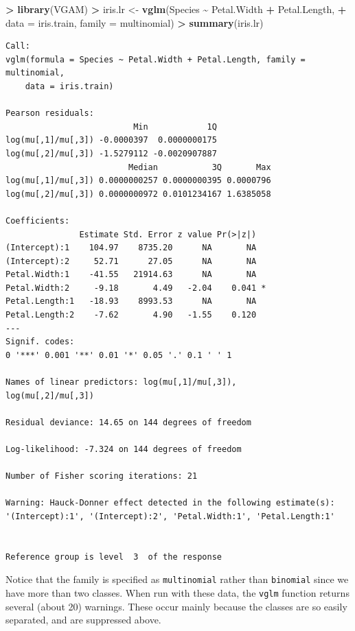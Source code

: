\documentclass[
]{krantz}
\makeatletter
\newenvironment{Shaded}{\begin{snugshade}}{\end{snugshade}}
\newcommand{\DataTypeTok}[1]{\textcolor[rgb]{0.27,0.27,0.27}{#1}}
\newcommand{\KeywordTok}[1]{\textcolor[rgb]{0.27,0.27,0.27}{\textbf{#1}}}
\newcommand{\NormalTok}[1]{#1}
\newcommand{\OperatorTok}[1]{\textcolor[rgb]{0.43,0.43,0.43}{\textbf{#1}}}
\newcommand{\StringTok}[1]{\textcolor[rgb]{0.5,0.5,0.5}{#1}}
\newenvironment{kframe}{%
\medskip{}
\setlength{\fboxsep}{.8em}
 \def\at@end@of@kframe{}%
 \ifinner\ifhmode%
  \def\at@end@of@kframe{\end{minipage}}%
  \begin{minipage}{\columnwidth}%
 \fi\fi%
 \def\FrameCommand##1{\hskip\@totalleftmargin \hskip-\fboxsep
 \colorbox{shadecolor}{##1}\hskip-\fboxsep
     \hskip-\linewidth \hskip-\@totalleftmargin \hskip\columnwidth}%
 \MakeFramed {\advance\hsize-\width
   \@totalleftmargin\z@ \linewidth\hsize
   \@setminipage}}%
 {\par\unskip\endMakeFramed%
 \at@end@of@kframe}
\renewenvironment{Shaded}{\begin{kframe}}{\end{kframe}}
\makeatother
\begin{document}
\begin{Shaded}
\begin{Highlighting}[]
\OperatorTok{\textgreater{}}\StringTok{ }\KeywordTok{library}\NormalTok{(VGAM)}
\OperatorTok{\textgreater{}}\StringTok{ }\NormalTok{iris.lr \textless{}{-}}\StringTok{ }\KeywordTok{vglm}\NormalTok{(Species }\OperatorTok{\textasciitilde{}}\StringTok{ }\NormalTok{Petal.Width }\OperatorTok{+}\StringTok{ }\NormalTok{Petal.Length, }
\OperatorTok{+}\StringTok{                 }\DataTypeTok{data =}\NormalTok{ iris.train, }\DataTypeTok{family =}\NormalTok{ multinomial)}
\OperatorTok{\textgreater{}}\StringTok{ }\KeywordTok{summary}\NormalTok{(iris.lr)}
\end{Highlighting}
\end{Shaded}

\begin{verbatim}
Call:
vglm(formula = Species ~ Petal.Width + Petal.Length, family = multinomial, 
    data = iris.train)

Pearson residuals:
                          Min            1Q
log(mu[,1]/mu[,3]) -0.0000397  0.0000000175
log(mu[,2]/mu[,3]) -1.5279112 -0.0020907887
                         Median           3Q       Max
log(mu[,1]/mu[,3]) 0.0000000257 0.0000000395 0.0000796
log(mu[,2]/mu[,3]) 0.0000000972 0.0101234167 1.6385058

Coefficients: 
               Estimate Std. Error z value Pr(>|z|)  
(Intercept):1    104.97    8735.20      NA       NA  
(Intercept):2     52.71      27.05      NA       NA  
Petal.Width:1    -41.55   21914.63      NA       NA  
Petal.Width:2     -9.18       4.49   -2.04    0.041 *
Petal.Length:1   -18.93    8993.53      NA       NA  
Petal.Length:2    -7.62       4.90   -1.55    0.120  
---
Signif. codes:  
0 '***' 0.001 '**' 0.01 '*' 0.05 '.' 0.1 ' ' 1

Names of linear predictors: log(mu[,1]/mu[,3]), 
log(mu[,2]/mu[,3])

Residual deviance: 14.65 on 144 degrees of freedom

Log-likelihood: -7.324 on 144 degrees of freedom

Number of Fisher scoring iterations: 21 

Warning: Hauck-Donner effect detected in the following estimate(s):
'(Intercept):1', '(Intercept):2', 'Petal.Width:1', 'Petal.Length:1'


Reference group is level  3  of the response
\end{verbatim}

Notice that the family is specified as \texttt{multinomial} rather than \texttt{binomial} since we have more than two classes. When run with these data, the \texttt{vglm} function returns several (about 20) warnings. These occur mainly because the classes are so easily separated, and are suppressed above.
\end{document}
